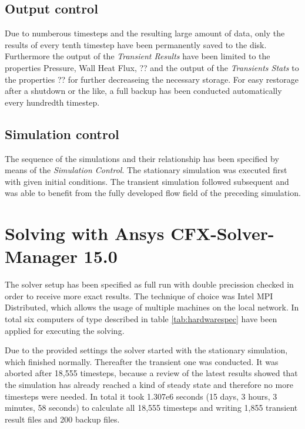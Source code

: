 \subsection{Output control}
Due to numberous timesteps and the resulting large amount of data, only the results of every tenth timestep have been permanently saved to the disk. Furthermore the output of the \emph{Transient Results} have been limited to the properties Pressure, Wall Heat Flux, ?? and the output of the \emph{Transients Stats} to the properties ?? for further decreaseing the necessary storage.
For easy restorage after a shutdown or the like, a full backup has been conducted automatically every hundredth timestep.
\subsection{Simulation control}
The sequence of the simulations and their relationship has been specified by means of the \emph{Simulation Control}. The stationary simulation was executed first with given initial conditions. The transient simulation followed subsequent and was able to benefit from the fully developed flow field of the preceding simulation.
\section{Solving with Ansys CFX-Solver-Manager 15.0}
The solver setup has been specified as full run with double precission checked in order to receive more exact results. The technique of choice was Intel MPI Distributed, which allows the usage of multiple machines on the local network. In total six computers of type described in table \ref{tab:hardwarespec} have been applied for executing the solving.

Due to the provided settings the solver started with the stationary simulation, which finished normally. Thereafter the transient one was conducted. It was aborted after 18,555 timesteps, because a review of the latest results showed that the simulation has already reached a kind of steady state and therefore no more timesteps were needed. In total it took 1.307e6 seconds (15 days, 3 hours, 3 minutes, 58 seconds) to calculate all 18,555 timesteps and writing 1,855 transient result files and 200 backup files.